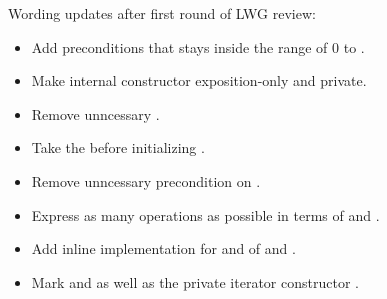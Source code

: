\begin{revision}
\item Wording updates after first round of LWG review:
  \begin{itemize}
    \item Add preconditions that  stays inside the range of 0 to .
    \item Make internal constructor exposition-only and private.
    \item Remove unncessary \std.
    \item Take the  before initializing .
    \item Remove unncessary precondition on .
    \item Express as many operations as possible in terms of \code{+=} and \code{-=}.
    \item Add inline implementation for  and  of
       and .
    \item Mark  and  as well as the private iterator constructor .
  \end{itemize}
\end{revision}
